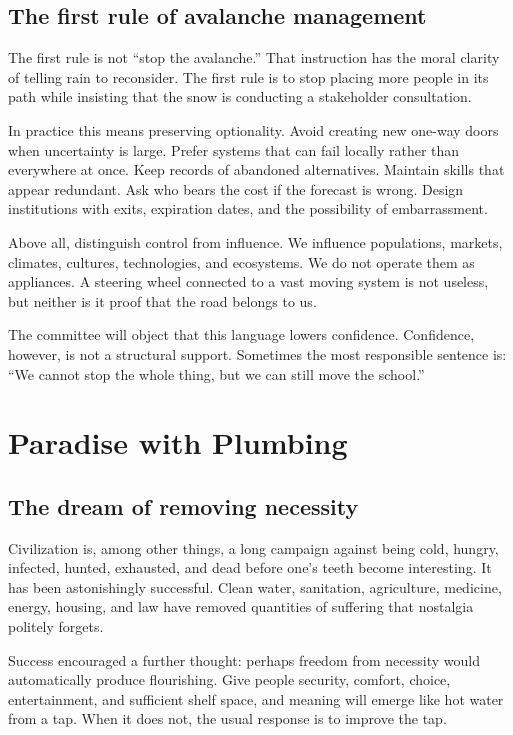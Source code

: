 \documentclass[12pt,a4paper]{book}
\begin{document}
\section{The first rule of avalanche management}

The first rule is not ``stop the avalanche.''  That instruction has the moral
clarity of telling rain to reconsider.  The first rule is to stop placing more
people in its path while insisting that the snow is conducting a stakeholder
consultation.

In practice this means preserving optionality.  Avoid creating new one-way
doors when uncertainty is large.  Prefer systems that can fail locally rather
than everywhere at once.  Keep records of abandoned alternatives.  Maintain
skills that appear redundant.  Ask who bears the cost if the forecast is
wrong.  Design institutions with exits, expiration dates, and the possibility
of embarrassment.

Above all, distinguish control from influence.  We influence populations,
markets, climates, cultures, technologies, and ecosystems.  We do not operate
them as appliances.  A steering wheel connected to a vast moving system is
not useless, but neither is it proof that the road belongs to us.

The committee will object that this language lowers confidence.  Confidence,
however, is not a structural support.  Sometimes the most responsible sentence
is: ``We cannot stop the whole thing, but we can still move the school.''

\chapter{Paradise with Plumbing}
\label{chap:paradise-plumbing}

\section{The dream of removing necessity}

Civilization is, among other things, a long campaign against being cold,
hungry, infected, hunted, exhausted, and dead before one's teeth become
interesting.  It has been astonishingly successful.  Clean water, sanitation,
agriculture, medicine, energy, housing, and law have removed quantities of
suffering that nostalgia politely forgets.

Success encouraged a further thought: perhaps freedom from necessity would
automatically produce flourishing.  Give people security, comfort, choice,
entertainment, and sufficient shelf space, and meaning will emerge like hot
water from a tap.  When it does not, the usual response is to improve the tap.
\end{document}
